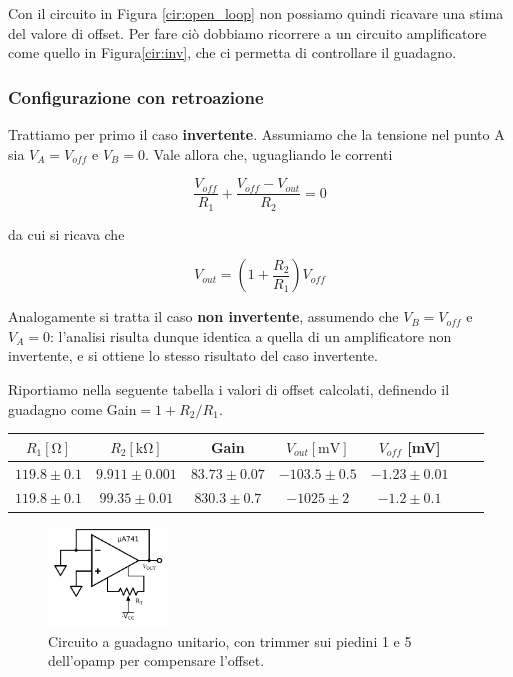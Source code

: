 Con il circuito in Figura \ref{cir:open_loop} non possiamo quindi ricavare una stima del valore di offset. Per fare ciò dobbiamo ricorrere a un circuito amplificatore come quello in Figura\ref{cir:inv}, che ci permetta di controllare il guadagno.

\subsubsection{Configurazione con retroazione}

Trattiamo per primo il caso \textbf{invertente}. Assumiamo che la tensione nel punto A sia $V_A=V_{off}$ e $V_B=0$. Vale allora che, uguagliando le correnti

$$\frac{V_{off}}{R_1} + \frac{V_{off}-V_{out}}{R_2} = 0$$

da cui si ricava che

$$V_{out}=\left(1+\frac{R_2}{R_1}\right) V_{off}$$

Analogamente si tratta il caso \textbf{non invertente}, assumendo che $V_B=V_{off}$ e $V_A=0$: l'analisi risulta dunque identica a quella di un amplificatore non invertente, e si ottiene lo stesso risultato del caso invertente. 

Riportiamo nella seguente tabella i valori di offset calcolati, definendo il guadagno come Gain$=1+R_2/R_1$. 

\begin{center}
\begin{savenotes}
\begin{tabular}{c|c|c|c|c|c|c}
$R_1[\si{\ohm}]$ & $R_2[\si{\kilo\ohm}]$ & Gain &$V_{out} [\si{\milli\volt}]$ & $V_{off}$ [\si{\milli\volt}]\\ 
\hline 
$119.8\pm0.1$ & $9.911\pm0.001$ & $83.73\pm0.07$&  $-103.5 \pm 0.5$ & $-1.23 \pm0.01$\\
\hline
$119.8\pm0.1$ & $99.35\pm0.01$ & $830.3\pm0.7$ &$ -1025 \pm 2$ & $-1.2 \pm0.1$\\

\end{tabular}
\end{savenotes}
\end{center}

\begin{figure}
  \begin{center}
    \includegraphics[width=0.280\textwidth]{../E02/latex/trimmer_correction.pdf}
  \end{center}
  \caption{Circuito a guadagno unitario, con trimmer sui piedini 1 e 5 dell'opamp per compensare l'offset.}
  \label{cir2:trimmer}
\end{figure}

